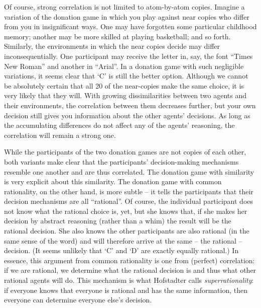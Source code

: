 Of course, strong correlation is not limited to atom-by-atom copies.
Imagine a variation of the donation game in which you play against near
copies who differ from you in insignificant ways. One may have forgotten
some particular childhood memory; another may be more skilled at playing
basketball; and so forth. Similarly, the environments in which the near
copies decide may differ inconsequentially. One participant may receive
the letter in, say, the font ``Times New Roman'' and another in
``Arial''. In a donation game with such negligible variations, it seems
clear that `C' is still the better option. Although we cannot be
absolutely certain that all 20 of the near-copies make the same choice,
it is very likely that they will. With growing dissimilarities between
two agents and their environments, the correlation between them
decreases further, but your own decision still gives you information
about the other agents' decisions. As long as the accumulating
differences do not affect any of the agents' reasoning, the correlation
will remain a strong one.

While the participants of the two donation games are not copies of each
other, both variants make clear that the participants' decision-making
mechanisms resemble one another and are thus correlated. The donation
game with similarity is very explicit about this similarity. The
donation game with common rationality, on the other hand, is more subtle
-- it tells the participants that their decision mechanisms are all
``rational''. Of course, the individual participant does not know what
the rational choice is, yet, but she knows that, if she makes her
decision by abstract reasoning (rather than a whim) the result will be
the rational decision. She also knows the other participants are also
rational (in the same sense of the word) and will therefore arrive at
the same -- the rational -- decision. (It seems unlikely that `C' and
`D' are exactly equally rational.) In essence, this argument from common
rationality is one from (perfect) correlation: if we are rational, we
determine what the rational decision is and thus what other rational
agents will do. This mechanism is what Hofstadter calls
\emph{superrationality}: if everyone knows that everyone is rational and
has the same information, then everyone can determine everyone else's
decision.

